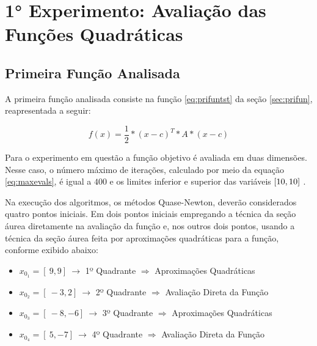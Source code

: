 

\section{1° Experimento: Avaliação das Funções Quadráticas}
    \subsection{Primeira Função Analisada}

    A primeira função analisada consiste na função \ref{eq:prifuntst} da seção \ref{sec:prifun}, reapresentada a seguir:

    \begin{equation*} 
        f(x)= \frac{1}{2}*(x-c)^{T}*A*(x-c)
    \end{equation*}

    Para o experimento em questão a função objetivo é avaliada em duas dimensões. Nesse caso, o número máximo de iterações, calculado por meio da equação \ref{eq:maxevals}, é igual a $400$ e os limites inferior e superior das variáveis $[\-10, 10 ]\ $.

    Na execução dos algoritmos, os métodos Quase-Newton, deverão considerados quatro pontos iniciais. Em dois pontos iniciais empregando a técnica da seção áurea diretamente na avaliação da função e, nos outros dois pontos, usando  a técnica da seção áurea feita por aproximações quadráticas para a função, conforme exibido abaixo:
    \begin{itemize}
        \item $x_{0_1}=[\ 9 , 9 ]\ \rightarrow$ 1º Quadrante $\Rightarrow$ Aproximações Quadráticas  
        \item $x_{0_2}=[\ -3 , 2 ]\ \rightarrow$ 2º Quadrante $\Rightarrow$ Avaliação Direta da Função
        \item $x_{0_3}=[\ -8 , -6 ]\ \rightarrow$ 3º Quadrante $\Rightarrow$ Aproximações Quadráticas  
        \item $x_{0_4}=[\ 5 , -7 ]\ \rightarrow$ 4º Quadrante $\Rightarrow$ Avaliação Direta da Função
    \end{itemize} 

